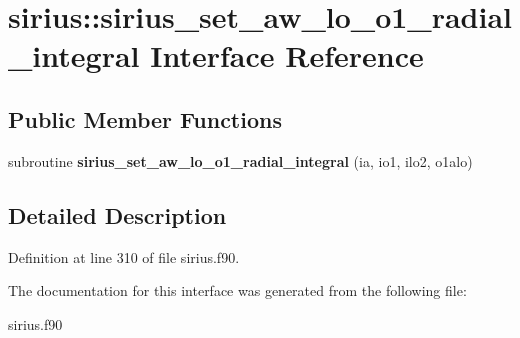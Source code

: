 \hypertarget{interfacesirius_1_1sirius__set__aw__lo__o1__radial__integral}{}\section{sirius\+:\+:sirius\+\_\+set\+\_\+aw\+\_\+lo\+\_\+o1\+\_\+radial\+\_\+integral Interface Reference}
\label{interfacesirius_1_1sirius__set__aw__lo__o1__radial__integral}
\subsection*{Public Member Functions}
\begin{DoxyCompactItemize}
\item 
\hypertarget{interfacesirius_1_1sirius__set__aw__lo__o1__radial__integral_aa61e5c89c35fcea252c9f8b7c4e75a2c}{}subroutine {\bfseries sirius\+\_\+set\+\_\+aw\+\_\+lo\+\_\+o1\+\_\+radial\+\_\+integral} (ia, io1, ilo2, o1alo)\label{interfacesirius_1_1sirius__set__aw__lo__o1__radial__integral_aa61e5c89c35fcea252c9f8b7c4e75a2c}

\end{DoxyCompactItemize}


\subsection{Detailed Description}


Definition at line 310 of file sirius.\+f90.



The documentation for this interface was generated from the following file\+:\begin{DoxyCompactItemize}
\item 
sirius.\+f90\end{DoxyCompactItemize}
